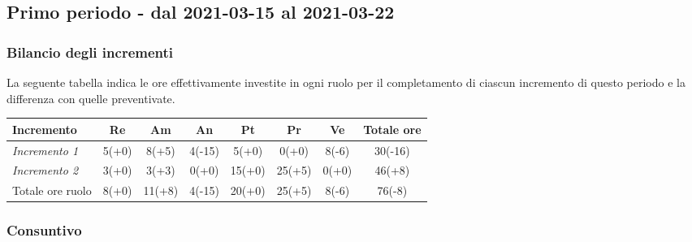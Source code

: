 {{{{{{\subsection{Primo periodo - dal 2021-03-15 al 2021-03-22}\label{ConsuntivoPrimoPeriodoDiProgettazioneDiDettaglioCodifica}

\subsubsection{Bilancio degli incrementi}\label{ConsuntivoPrimoPeriodoDiProgettazioneDiDettaglioCodificaIncrementi}

La seguente tabella indica le ore effettivamente investite in ogni ruolo per il completamento di ciascun incremento di questo periodo e la differenza con quelle preventivate.

\quad
\def\tabularxcolumn#1{m{#1}}
{
	
	\begin{center}
		\renewcommand{\arraystretch}{1.4}
		\begin{tabularx}{\textwidth}{|X|c|c|c|c|c|c|c|}
			\hline
			\rowcolor{airforceblue}
			\textbf{Incremento} & \textbf{Re} & \textbf{Am} & \textbf{An} & \textbf{Pt} & \textbf{Pr} & \textbf{Ve} & \textbf{Totale ore}\\
			\hline
			\textit{Incremento 1} & 5(+0) & 8(+5) & 4(-15) & 5(+0) & 0(+0) & 8(-6) & 30(-16) \\
			\hline
			\textit{Incremento 2} & 3(+0) & 3(+3) & 0(+0) & 15(+0) & 25(+5) & 0(+0) & 46(+8)\\
			\hline
			Totale ore ruolo & 8(+0) & 11(+8) & 4(-15) & 20(+0) & 25(+5) & 8(-6) & 76(-8)\\
			\hline
		\end{tabularx}
	\end{center}

\subsubsection{Consuntivo}\label{ConsuntivoPrimoPeriodoDiProgettazioneDiDettaglioCodificaIncrementiCosto}

}}}}}}}
